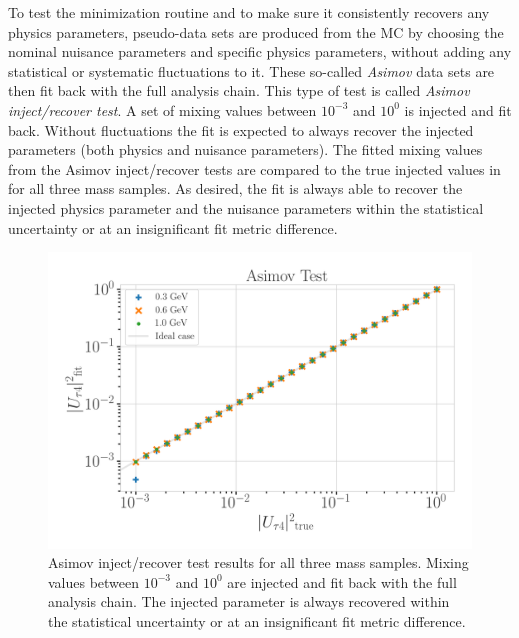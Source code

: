 To test the minimization routine and to make sure it consistently recovers any physics parameters, pseudo-data sets are produced from the MC by choosing the nominal nuisance parameters and specific physics parameters, without adding any statistical or systematic fluctuations to it. These so-called \textit{Asimov} data sets are then fit back with the full analysis chain. This type of test is called \textit{Asimov inject/recover test}. A set of mixing values between $10^{-3}$ and $10^{0}$ is injected and fit back.
Without fluctuations the fit is expected to always recover the injected parameters (both physics and nuisance parameters). The fitted mixing values from the Asimov inject/recover tests are compared to the true injected values in  for all three mass samples. As desired, the fit is always able to recover the injected physics parameter and the nuisance parameters within the statistical uncertainty or at an insignificant fit metric difference. 

\begin{figure}[h]
    \includegraphics{figures/results/checks/asimov_tests_combined.png}
	\caption[Asimov inject/recover test]{Asimov inject/recover test results for all three mass samples. Mixing values between $10^{-3}$ and $10^{0}$ are injected and fit back with the full analysis chain. The injected parameter is always recovered within the statistical uncertainty or at an insignificant fit metric difference.}
\end{figure}


